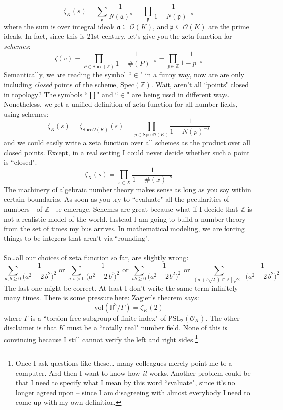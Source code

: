 \documentclass[12pt]{article}
\begin{document}
$$ \zeta_K(s) = \sum_{\mathfrak{a}} \frac{1}{N(\mathfrak{a})^s}
= \prod_{\mathfrak{p}} \frac{1}{1 - N(\mathfrak{p})^{-s} } $$
where the sum is over integral ideals $\mathfrak{a} \subseteq \mathcal{O}(K)$, and $\mathfrak{p}\subseteq \mathcal{O}(K)$ are the prime ideals.  In fact, since this is 21st century, let's give you the zeta function for \textit{schemes}:
$$  \zeta(s) = \prod_{P \in \text{Spec}(\mathbb{Z})} 
\frac{1}{1 - \#(P)^{-s} }  = \prod_{p \in \mathbb{Z}} 
\frac{1}{1 - p^{-s} }$$
Semantically, we are reading the symbol ``$\in$" in a funny way, now are are only including \textit{closed} points of the scheme, $\text{Spec}(\mathbb{Z})$.  Wait, aren't all ``points" closed in topology?  The symbols ``$\prod$" and ``$\in$" are being used in different ways.  Nonetheless, we get a unified definition of zeta function for all number fields, using schemes:
$$ \zeta_K(s) = \zeta_{\text{Spec}\mathcal{O}(K)}(s)
= \prod_{p \in \text{Spec}\mathcal{O}(K) } \frac{1}{1 - N(p)^{-s}}$$
and we could easily write a zeta function over all schemes as the product over all closed points.  Except, in a real setting I could never decide whether such a point is ``closed".
$$ \zeta_X(s) = \prod_{x \in X} \frac{1}{1 - \#(x)^{-s}} $$
The machinery of algebraic number theory makes sense as long as you say within certain boundaries.  As soon as you try to ``evaluate" all the pecularities of numbers - of $\mathbb{Z}$ - re-emerage.  Schemes are great because what if I decide that $\mathbb{Z}$ is not a realistic model of the world.  Instead I am going to build a number theory from the set of times my bus arrives.  In mathematical modeling, we are forcing things to be integers that aren't via ``rounding". \\ \\
So\dots all our choices of zeta function so far, are slightly wrong:
$$\sum_{a,b \geq 0} \frac{1}{\big(a^2 - 2\, b^2\big)^2} \text{ or }
\sum_{a,b > 0} \frac{1}{\big(a^2 - 2\, b^2\big)^2}\text{ or }
\sum_{ab \geq 0} \frac{1}{\big(a^2 - 2\, b^2\big)^2}
\text{ or }
\sum_{(a+b\sqrt{2}) \subseteq \mathbb{Z}[\sqrt{2}]} \frac{1}{\big(a^2 - 2\, b^2\big)^2} $$
The last one might be correct.  At least I don't write the same term infinitely many times.  There is some pressure here:  Zagier's theorem says:
$$ \text{vol}(\mathbb{H}^3 / \Gamma) = \zeta_K(2) $$
where $\Gamma$ is a ``torsion-free subgroup of finite index" of $\text{PSL}_2( \mathcal{O}_{K})$.  The other disclaimer is that $K$ must be a ``totally real" number field.  None of this is convincing because I still cannot verify the left and right sides.\footnote{Once I ask questions like these... many colleagues merely point me to a computer.  And then I want to know how \textit{it} works.  Another problem could be that I need to specify what I mean by this word ``evaluate", since it's no longer agreed upon -- since I am disagreeing with almost everybody I need to come up with my own definition.}
\end{document}
